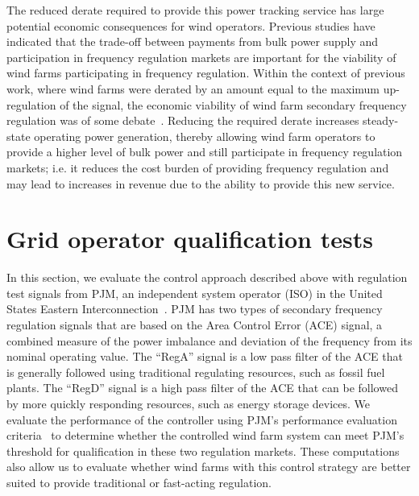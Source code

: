 The reduced derate required to provide this power tracking service has large potential economic consequences for wind operators. Previous studies have indicated that the trade-off between payments from bulk power supply and participation in frequency regulation markets are important for the viability of wind farms participating in frequency regulation. Within the context of previous work, where wind farms were derated by an amount equal to the maximum up-regulation of the signal, the economic viability of wind farm secondary frequency regulation was of some debate~\cite{Kirby2010a, Rose2014a}. Reducing the required derate increases steady-state operating power generation, thereby allowing wind farm operators to provide a higher level of bulk power and still participate in frequency regulation markets; i.e. it reduces the cost burden of providing frequency regulation and may lead to increases in revenue due to the ability to provide this new service.

\section{Grid operator qualification tests}
\label{sec:rhc-pjm}
In this section, we evaluate the control approach described above with regulation test signals from PJM, an independent system operator (ISO) in the United States Eastern Interconnection~\cite{PJMm11, PJMm12}. PJM has two types of secondary frequency regulation signals that are based on the Area Control Error (ACE) signal, a combined measure of the power imbalance and deviation of the frequency from its nominal operating value. The ``RegA'' signal is a low pass filter of the ACE that is generally followed using traditional regulating resources, such as fossil fuel plants. The ``RegD'' signal is a high pass filter of the ACE that can be followed by more quickly responding resources, such as energy storage devices. We evaluate the performance of the controller using PJM's performance evaluation criteria~\cite{PJMm11, PJMm12} to determine whether the controlled wind farm system can meet PJM's threshold for qualification in these two regulation markets. These computations also allow us to evaluate whether wind farms with this control strategy are better suited to provide traditional or fast-acting regulation.

